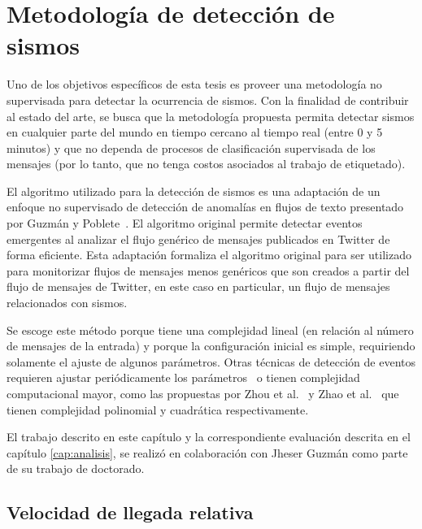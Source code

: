 \chapter{Metodología de detección de sismos}
\label{cap:deteccion}

Uno de los objetivos específicos de esta tesis es proveer una metodología no supervisada para detectar la ocurrencia de sismos. 
%
Con la finalidad de contribuir al estado del arte, se busca que la metodología propuesta permita detectar sismos en cualquier parte del mundo en tiempo cercano al tiempo real (entre 0 y 5 minutos) y que no dependa de procesos de clasificación supervisada de los mensajes (por lo tanto, que no tenga costos asociados al trabajo de etiquetado). 


El algoritmo utilizado para la detección de sismos es una adaptación de un enfoque no supervisado de detección de anomalías en flujos de texto presentado por Guzmán y Poblete~\cite{guzman2013line}. 
%
El algoritmo original permite detectar eventos emergentes al analizar el flujo genérico de mensajes publicados en Twitter de forma eficiente.  
%
Esta adaptación formaliza el algoritmo original para ser utilizado para monitorizar 
flujos de mensajes menos genéricos que son creados a partir del flujo de mensajes de Twitter, en este caso en particular, un flujo de mensajes relacionados con sismos.

Se escoge este método porque tiene una complejidad lineal (en relación al número de mensajes de la entrada) y porque la configuración inicial es simple, requiriendo solamente el ajuste de algunos parámetros.
%
Otras técnicas de detección de eventos requieren ajustar periódicamente los parámetros~\cite{mathioudakis2010twittermonitor,sankaranarayanan2009twitterstand} o tienen complejidad computacional mayor, como las propuestas por Zhou et al.~\cite{zhou2015unsupervised} y Zhao et al.~\cite{zhao2014unsupervised} que tienen complejidad polinomial y cuadrática respectivamente. 

El trabajo descrito en este capítulo y la correspondiente evaluación descrita en el capítulo \ref{cap:analisis}, se realizó en colaboración con Jheser Guzmán como parte de su trabajo de doctorado.


\section{Velocidad de llegada relativa}

